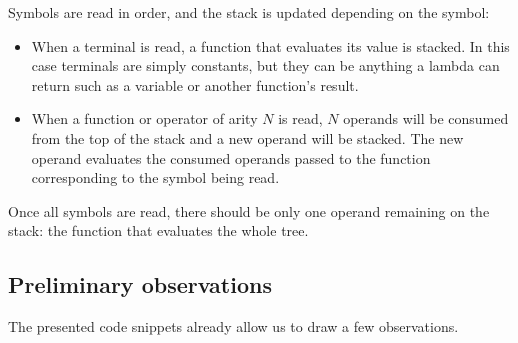\documentclass[../main]{subfiles}
\begin{document}
Symbols are read in order, and the stack is updated depending on the symbol:

\begin{itemize}
\item When a terminal is read, a function that evaluates its value is stacked.
In this case terminals are simply constants, but they can be anything a \cpp
lambda can return such as a variable or another function's result.

\item When a function or operator of arity $N$ is read, $N$ operands will be
consumed from the top of the stack and a new operand will be stacked.
The new operand evaluates the consumed operands passed to the function
corresponding to the symbol being read.
\end{itemize}

Once all symbols are read, there should be only one operand remaining
on the stack: the function that evaluates the whole tree.

\subsection{
  Preliminary observations
}

The presented code snippets already allow us to draw a few observations.
\end{document}
